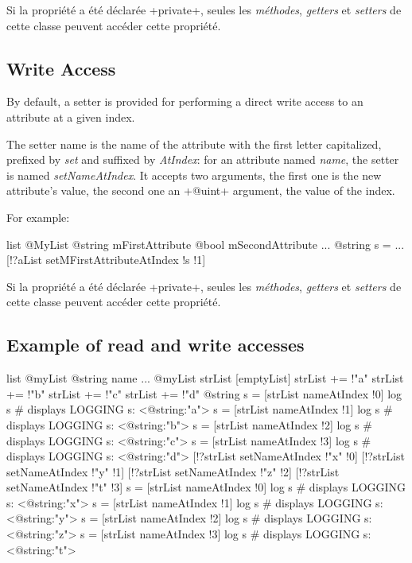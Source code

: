 Si la propriété a été déclarée \ggsq+private+, seules les \emph{méthodes}, \emph{getters} et \emph{setters} de cette classe peuvent accéder cette propriété.



\subsection{Write Access}

By default, a setter is provided for performing a direct write access to an attribute at a given index.

The setter name is the name of the attribute with the first letter capitalized, prefixed by \emph{set} and suffixed by \emph{AtIndex}: for an attribute named \emph{name}, the setter is named \emph{setNameAtIndex}. It accepts two arguments, the first one is the new attribute's value, the second one an \ggsq+@uint+ argument, the value of the index.

For example:

\begin{galgas4}
list @MyList {
  @string mFirstAttribute
  @bool mSecondAttribute
}
...
@string s = ...
[!?aList setMFirstAttributeAtIndex !s !1]
\end{galgas4}

Si la propriété a été déclarée \ggsq+private+, seules les \emph{méthodes}, \emph{getters} et \emph{setters} de cette classe peuvent accéder cette propriété.


\subsection{Example of read and write accesses}

\begin{galgas4}
list @myList {
  @string name
}
...
@myList strList [emptyList]
strList += !"a"
strList += !"b"
strList += !"c"
strList += !"d"
@string s = [strList nameAtIndex !0]
log s # displays LOGGING s: <@string:"a">
s = [strList nameAtIndex !1]
log s # displays LOGGING s: <@string:"b">
s = [strList nameAtIndex !2]
log s # displays LOGGING s: <@string:"c">
s = [strList nameAtIndex !3]
log s # displays LOGGING s: <@string:"d">
[!?strList setNameAtIndex !"x" !0]
[!?strList setNameAtIndex !"y" !1]
[!?strList setNameAtIndex !"z" !2]
[!?strList setNameAtIndex !"t" !3]
s = [strList nameAtIndex !0]
log s # displays LOGGING s: <@string:"x">
s = [strList nameAtIndex !1]
log s # displays LOGGING s: <@string:"y">
s = [strList nameAtIndex !2]
log s # displays LOGGING s: <@string:"z">
s = [strList nameAtIndex !3]
log s # displays LOGGING s: <@string:"t">
\end{galgas4}



